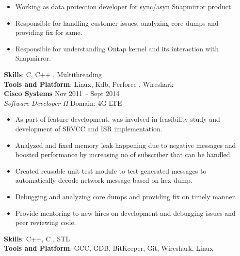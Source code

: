 \documentclass[margin,line]{res}
\begin{document}
\begin{resume}
\begin{itemize}
\item Working as data protection developer for sync/asyn Snapmirror product.\\
\item Responsible for handling customer issues, analyzing core dumps and providing fix for same.\\
\item Responsible for understanding Ontap kernel and its interaction with Snapmirror.

\end{itemize}

{\bf Skills}: C, C++ , Multithreading \\
{\bf Tools and Platform}: Linux, Kdb, Perforce , Wireshark\\



{\bf Cisco Systems}                \hfill{Nov 2011 -- Sept 2014}\\
{\em Software Developer II}  \hfill {Domain: 4G LTE}\\

\begin{itemize} %
\setlength\itemsep{-1em}

\item As part of feature development, was involved in feasibility study and development of SRVCC and ISR implementation.\\
\item Analyzed and fixed memory leak happening due to negative messages and boosted performance by  
 increasing no of subscriber that can be handled.\\
\item Created reusable unit test module to test generated messages to automatically decode network  
   message based on hex dump.\\
\item Debugging and analyzing core dumps and providing fix on timely manner.\\
\item Provide mentoring to new hires on development and debugging issues and peer reviewing code.

\end{itemize}

{\bf Skills}: C++, C , STL \\
{\bf Tools and Platform}: GCC, GDB, BitKeeper, Git, Wireshark, Linux\\





\end{resume}
\end{document}
